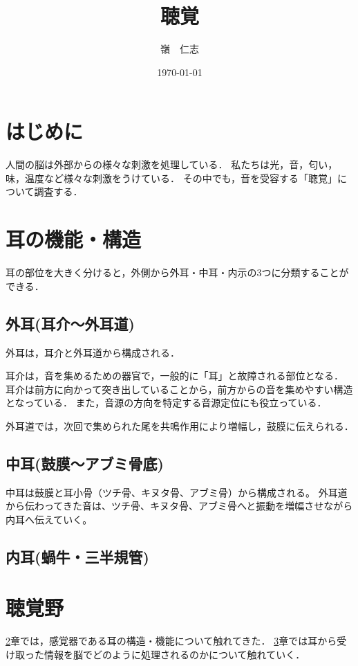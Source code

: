 \documentclass[12pt]{jarticle}
\title{聴覚}
\author{嶺　仁志}
\date{\today}
\begin{document}
\maketitle
\section{はじめに}
\label{intro}
人間の脳は外部からの様々な刺激を処理している．
私たちは光，音，匂い，味，温度など様々な刺激をうけている．
その中でも，音を受容する「聴覚」について調査する．\cite{構造}
\section{耳の機能・構造}
\label{ear}
耳の部位を大きく分けると，外側から外耳・中耳・内示の3つに分類することができる．
\subsection{外耳(耳介～外耳道)}
\label{outer}
外耳は，耳介と外耳道から構成される．

耳介は，音を集めるための器官で，一般的に「耳」と故障される部位となる．
耳介は前方に向かって突き出していることから，前方からの音を集めやすい構造となっている．
また，音源の方向を特定する音源定位にも役立っている．

外耳道では，次回で集められた尾を共鳴作用により増幅し，鼓膜に伝えられる．
\subsection{中耳(鼓膜～アブミ骨底)}
\label{midle}
中耳は鼓膜と耳小骨（ツチ骨、キヌタ骨、アブミ骨）から構成される。
外耳道から伝わってきた音は、ツチ骨、キヌタ骨、アブミ骨へと振動を増幅させながら内耳へ伝えていく。
\subsection{内耳(蝸牛・三半規管)}
\label{inner}
\section{聴覚野}
\label{聴覚野}
\ref{ear}章では，感覚器である耳の構造・機能について触れてきた．
\ref{聴覚野}章では耳から受け取った情報を脳でどのように処理されるのかについて触れていく．\cite{聴覚野}



\end{document}
